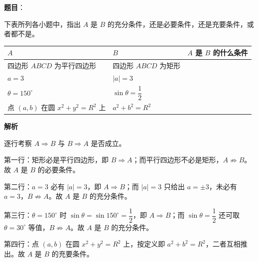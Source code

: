 \begin{answer}

\textbf{题目}：

下表所列各小题中，指出 $A$ 是 $B$ 的充分条件，还是必要条件，还是充要条件，或者都不是。

\begin{center}
\begin{tabular}{lll}
\toprule
$A$ & $B$ & $A$ 是 $B$ 的什么条件 \\
\midrule
四边形 $ABCD$ 为平行四边形 & 四边形 $ABCD$ 为矩形 &  \\
$a=3$ & $\lvert a\rvert=3$ &  \\
$\theta=150^\circ$ & $\sin\theta=\dfrac12$ &  \\
点 $(a,b)$ 在圆 $x^2+y^2=R^2$ 上 & $a^2+b^2=R^2$ &  \\
\bottomrule
\end{tabular}
\end{center}

\textbf{解析}

逐行考察 $A\Rightarrow B$ 与 $B\Rightarrow A$ 是否成立。

第一行：矩形必是平行四边形，即 $B\Rightarrow A$；而平行四边形不必是矩形，$A\not\Rightarrow B$。故 $A$ 是 $B$ 的必要条件。

第二行：$a=3$ 必有 $\lvert a\rvert=3$，即 $A\Rightarrow B$；而 $\lvert a\rvert=3$ 只给出 $a=\pm3$，未必有 $a=3$，$B\not\Rightarrow A$。故 $A$ 是 $B$ 的充分条件。

第三行：$\theta=150^\circ$ 时 $\sin\theta=\sin150^\circ=\dfrac12$，即 $A\Rightarrow B$；而 $\sin\theta=\dfrac12$ 还可取 $\theta=30^\circ$ 等值，$B\not\Rightarrow A$。故 $A$ 是 $B$ 的充分条件。

第四行：点 $(a,b)$ 在圆 $x^2+y^2=R^2$ 上，按定义即 $a^2+b^2=R^2$，二者互相推出。故 $A$ 是 $B$ 的充要条件。


\end{answer}
